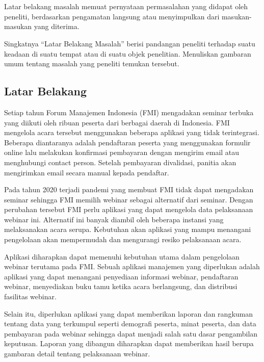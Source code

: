 \chapter{\babSatu}

Latar belakang masalah memuat pernyataan permasalahan yang didapat oleh peneliti,
berdasarkan pengamatan langsung atau menyimpulkan dari masukan-masukan yang diterima.

Singkatnya “Latar Belakang Masalah” berisi pandangan peneliti terhadap suatu keadaan di suatu tempat atau di suatu objek penelitian.
Menuliskan gambaran umum tentang masalah yang peneliti temukan tersebut.

\section{Latar Belakang}
Setiap tahun Forum Manajemen Indonesia (FMI) mengadakan seminar terbuka yang diikuti oleh ribuan peserta dari berbagai daerah di Indonesia. FMI mengelola acara tersebut menggunakan beberapa aplikasi yang tidak terintegrasi. Beberapa diantaranya adalah pendaftaran peserta yang menggunakan formulir online lalu melakukan konfirmasi pembayaran dengan mengirim email atau menghubungi contact person. Setelah pembayaran divalidasi, panitia akan mengirimkan email secara manual kepada pendaftar.

Pada tahun 2020 terjadi pandemi yang membuat FMI tidak dapat mengadakan seminar sehingga FMI memilih webinar sebagai alternatif dari seminar. Dengan perubahan tersebut FMI perlu aplikasi yang dapat mengelola data pelaksanaan webinar ini. Alternatif ini banyak diambil oleh beberapa instansi yang melaksanakan acara serupa. Kebutuhan akan aplikasi yang mampu menangani pengelolaan akan mempermudah dan mengurangi resiko pelaksanaan acara.

Aplikasi diharapkan dapat memenuhi kebutuhan utama dalam pengelolaan webinar terutama pada FMI. Sebuah aplikasi manajemen yang diperlukan adalah aplikasi yang dapat menangani penyediaan informasi webinar, pendaftaran webinar, menyediakan buku tamu ketika acara berlangsung, dan distribusi fasilitas webinar.

Selain itu, diperlukan aplikasi yang dapat memberikan laporan dan rangkuman tentang data yang terkumpul seperti demografi peserta, minat peserta, dan data pembayaran pada webinar sehingga dapat menjadi salah satu dasar pengambilan keputusan. Laporan yang dibangun diharapkan dapat memberikan hasil berupa gambaran detail tentang pelaksanaan webinar.

